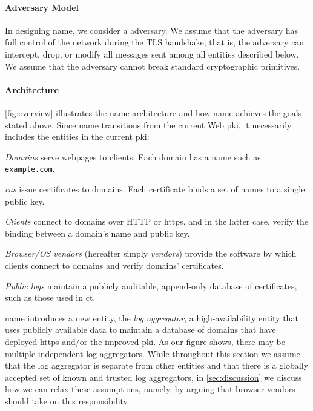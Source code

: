 \paragraph{Adversary Model}
In designing \ac{name}, we consider a  adversary. 
We assume that the adversary has full
control of the network during the TLS handshake; that is, the adversary can
intercept, drop, or modify all messages sent among all entities described
below. We assume that the adversary cannot break standard cryptographic primitives.

\paragraph{Architecture}
\autoref{fig:overview} illustrates the \ac{name} architecture and how \ac{name}
achieves the goals stated above. Since \ac{name} transitions from the current
Web \ac{pki}, it necessarily includes the entities in the current \ac{pki}:
\begin{compactitem}
\item \emph{Domains} serve webpages to clients. Each domain has a name such as
  \texttt{example.com}.
\item \emph{\acp{ca}} issue certificates to domains. Each certificate binds a
  set of names to a single public key.
\item \emph{Clients} connect to domains over HTTP or \ac{https}, and in the
  latter case, verify the binding between a domain's name and public key.
\item \emph{Browser/OS vendors} (hereafter simply \emph{vendors}) provide the
  software by which clients connect to domains and verify domains' certificates.
\item \emph{Public logs} maintain a publicly auditable, append-only database of
  certificates, such as those used in \ac{ct}.
\end{compactitem}
\ac{name} introduces a new entity, the \emph{log aggregator}, a
high-availability entity that uses publicly available data to maintain a
database of domains that have deployed \ac{https} and/or the improved \ac{pki}.
As our figure shows, there may be multiple independent log aggregators. While
throughout this section we assume that the log aggregator is separate from other
entities and that there is a globally accepted set of known and trusted log
aggregators, in \autoref{sec:discussion} we discuss how we can relax these
assumptions, namely, by arguing that browser vendors should take on this
responsibility.

